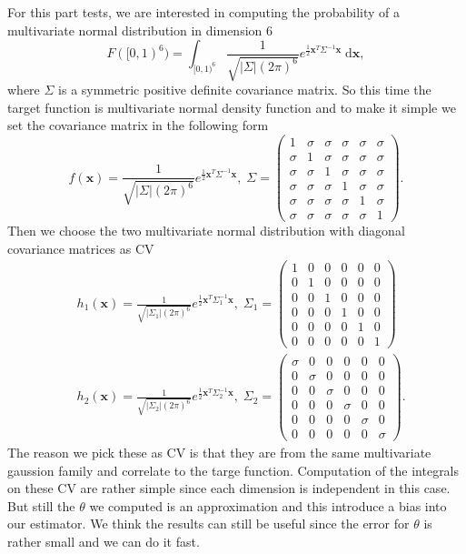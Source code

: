 For this part tests, we are interested in computing the probability of a multivariate normal distribution in dimension 6
\[
    F([0,1)^6)=\int_{[0,1)^6}\frac{1}{\sqrt{|\Sigma|(2\pi)^6}}
        e^{\frac{1}{2}\mathbf{x}^T\Sigma^{-1}\mathbf{x}}
        \;\textrm{d}\mathbf{x},
    \]
where $\Sigma$ is a symmetric positive definite covariance matrix. 
So this time the target function is multivariate normal density function and to make it simple we set the covariance matrix in the following form 
\[
    f(\mathbf{x})= \frac{1}{\sqrt{|\Sigma|(2\pi)^6}}
        e^{\frac{1}{2}\mathbf{x}^T\Sigma^{-1}\mathbf{x}},\;
\Sigma=
\begin{pmatrix}
    1&\sigma&\sigma&\sigma&\sigma&\sigma\\[-1.5em]
    \sigma&1&\sigma&\sigma&\sigma&\sigma\\[-1.5em]
    \sigma&\sigma&1&\sigma&\sigma&\sigma\\[-1.5em]
    \sigma&\sigma&\sigma&1&\sigma&\sigma\\[-1.5em]
    \sigma&\sigma&\sigma&\sigma&1&\sigma\\[-1.5em]
    \sigma&\sigma&\sigma&\sigma&\sigma&1
\end{pmatrix}.
\]
Then we choose the two multivariate normal distribution with diagonal covariance matrices as CV 
\begin{align*}
&h_1(\mathbf{x})= \frac{1}{\sqrt{|\Sigma_1|(2\pi)^6}}
        e^{\frac{1}{2}\mathbf{x}^T\Sigma_1^{-1}\mathbf{x}},\;
    \Sigma_1=
\begin{pmatrix}
    1&0&0&0&0&0\\[-1.5em]
    0&1&0&0&0&0\\[-1.5em]
    0&0&1&0&0&0\\[-1.5em]
    0&0&0&1&0&0\\[-1.5em]
    0&0&0&0&1&0\\[-1.5em]
    0&0&0&0&0&1
\end{pmatrix}\\
&h_2(\mathbf{x})= \frac{1}{\sqrt{|\Sigma_2|(2\pi)^6}}
        e^{\frac{1}{2}\mathbf{x}^T\Sigma_2^{-1}\mathbf{x}},\;
\Sigma_2=
\begin{pmatrix}
    \sigma&0&0&0&0&0\\[-1.5em]
    0&\sigma&0&0&0&0\\[-1.5em]
    0&0&\sigma&0&0&0\\[-1.5em]
    0&0&0&\sigma&0&0\\[-1.5em]
    0&0&0&0&\sigma&0\\[-1.5em]
    0&0&0&0&0&\sigma
\end{pmatrix}.
\end{align*}
The reason we pick these as CV is that they are from the same multivariate gaussion family and correlate to the targe function. 
Computation of the integrals on these CV are rather simple since each dimension is independent in this case. But still the $\theta$ we computed is an approximation and this introduce a bias into our estimator. 
We think the results can still be useful since the error for $\theta$ is rather small and we can do it fast.

